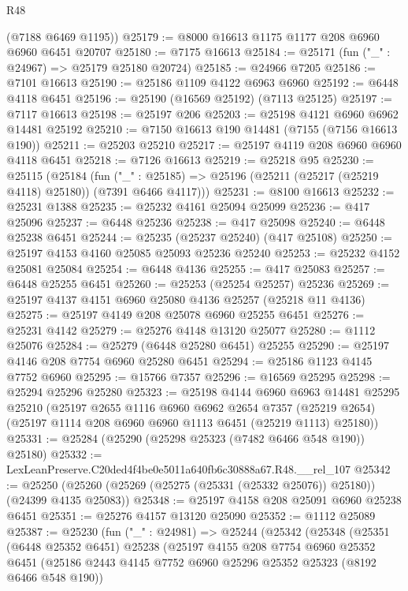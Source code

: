 \begin{lexlean}{R48}
\begin{coremodule}
      (@7188 @6469 @1195))
@25179 := @8000 @16613 @1175 @1177 @208 @6960 @6960 @6451 @20707
@25180 := @7175 @16613
@25184 := @25171 (fun ("_" : @24967) => @25179 @25180 @20724)
@25185 := @24966 @7205
@25186 := @7101 @16613
@25190 := @25186 @1109 @4122 @6963 @6960
@25192 := @6448 @4118 @6451
@25196 := @25190 (@16569 @25192) (@7113 @25125)
@25197 := @7117 @16613
@25198 := @25197 @206
@25203 := @25198 @4121 @6960 @6962 @14481 @25192
@25210 := @7150 @16613 @190 @14481 (@7155 (@7156 @16613 @190))
@25211 := @25203 @25210
@25217 := @25197 @4119 @208 @6960 @6960 @4118 @6451
@25218 := @7126 @16613
@25219 := @25218 @95
@25230 := @25115
    (@25184
      (fun ("_" : @25185) => @25196 (@25211 (@25217 (@25219 @4118) @25180)) (@7391 @6466 @4117)))
@25231 := @8100 @16613
@25232 := @25231 @1388
@25235 := @25232 @4161 @25094 @25099
@25236 := @417 @25096
@25237 := @6448 @25236
@25238 := @417 @25098
@25240 := @6448 @25238 @6451
@25244 := @25235 (@25237 @25240) (@417 @25108)
@25250 := @25197 @4153 @4160 @25085 @25093 @25236 @25240
@25253 := @25232 @4152 @25081 @25084
@25254 := @6448 @4136
@25255 := @417 @25083
@25257 := @6448 @25255 @6451
@25260 := @25253 (@25254 @25257) @25236
@25269 := @25197 @4137 @4151 @6960 @25080 @4136 @25257 (@25218 @11 @4136)
@25275 := @25197 @4149 @208 @25078 @6960 @25255 @6451
@25276 := @25231 @4142
@25279 := @25276 @4148 @13120 @25077
@25280 := @1112 @25076
@25284 := @25279 (@6448 @25280 @6451) @25255
@25290 := @25197 @4146 @208 @7754 @6960 @25280 @6451
@25294 := @25186 @1123 @4145 @7752 @6960
@25295 := @15766 @7357
@25296 := @16569 @25295
@25298 := @25294 @25296 @25280
@25323 := @25198
    @4144
    @6960
    @6963
    @14481
    @25295
    @25210
    (@25197
      @2655
      @1116
      @6960
      @6962
      @2654
      @7357
      (@25219 @2654)
      (@25197 @1114 @208 @6960 @6960 @1113 @6451 (@25219 @1113) @25180))
@25331 := @25284 (@25290 (@25298 @25323 (@7482 @6466 @548 @190)) @25180)
@25332 := LexLeanPreserve.C20ded4f4be0e5011a640fb6c30888a67.R48.__rel_107
@25342 := @25250 (@25260 (@25269 (@25275 (@25331 (@25332 @25076)) @25180)) (@24399 @4135 @25083))
@25348 := @25197 @4158 @208 @25091 @6960 @25238 @6451
@25351 := @25276 @4157 @13120 @25090
@25352 := @1112 @25089
@25387 := @25230
    (fun ("_" : @24981) =>
    @25244
      (@25342
        (@25348
          (@25351
            (@6448 @25352 @6451)
            @25238
            (@25197
              @4155
              @208
              @7754
              @6960
              @25352
              @6451
              (@25186 @2443 @4145 @7752 @6960 @25296 @25352 @25323 (@8192 @6466 @548 @190))

\end{coremodule}
\end{lexlean}
